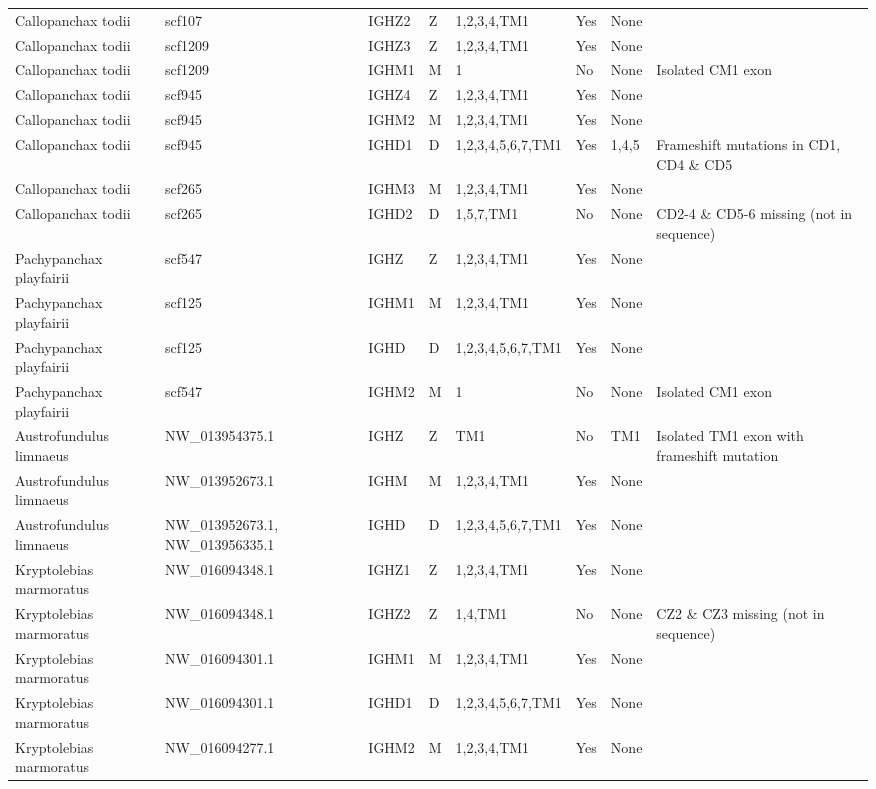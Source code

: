 \begin{tabular}{llllllll}
  Callopanchax todii & scf107 & IGHZ2 & Z & 1,2,3,4,TM1 & Yes & None &  \\ 
  Callopanchax todii & scf1209 & IGHZ3 & Z & 1,2,3,4,TM1 & Yes & None &  \\ 
  Callopanchax todii & scf1209 & IGHM1 & M & 1 & No & None & Isolated CM1 exon \\ 
  Callopanchax todii & scf945 & IGHZ4 & Z & 1,2,3,4,TM1 & Yes & None &  \\ 
  Callopanchax todii & scf945 & IGHM2 & M & 1,2,3,4,TM1 & Yes & None &  \\ 
  Callopanchax todii & scf945 & IGHD1 & D & 1,2,3,4,5,6,7,TM1 & Yes & 1,4,5 & Frameshift mutations in CD1, CD4 \& CD5 \\ 
  Callopanchax todii & scf265 & IGHM3 & M & 1,2,3,4,TM1 & Yes & None &  \\ 
  Callopanchax todii & scf265 & IGHD2 & D & 1,5,7,TM1 & No & None & CD2-4 \& CD5-6 missing (not in sequence) \\ 
  Pachypanchax playfairii & scf547 & IGHZ & Z & 1,2,3,4,TM1 & Yes & None &  \\ 
  Pachypanchax playfairii & scf125 & IGHM1 & M & 1,2,3,4,TM1 & Yes & None &  \\ 
  Pachypanchax playfairii & scf125 & IGHD & D & 1,2,3,4,5,6,7,TM1 & Yes & None &  \\ 
  Pachypanchax playfairii & scf547 & IGHM2 & M & 1 & No & None & Isolated CM1 exon \\ 
  Austrofundulus limnaeus & NW\_013954375.1 & IGHZ & Z & TM1 & No & TM1 & Isolated TM1 exon with frameshift mutation \\ 
  Austrofundulus limnaeus & NW\_013952673.1 & IGHM & M & 1,2,3,4,TM1 & Yes & None &  \\ 
  Austrofundulus limnaeus & NW\_013952673.1, NW\_013956335.1 & IGHD & D & 1,2,3,4,5,6,7,TM1 & Yes & None &  \\ 
  Kryptolebias marmoratus & NW\_016094348.1 & IGHZ1 & Z & 1,2,3,4,TM1 & Yes & None &  \\ 
  Kryptolebias marmoratus & NW\_016094348.1 & IGHZ2 & Z & 1,4,TM1 & No & None & CZ2 \& CZ3 missing (not in sequence) \\ 
  Kryptolebias marmoratus & NW\_016094301.1 & IGHM1 & M & 1,2,3,4,TM1 & Yes & None &  \\ 
  Kryptolebias marmoratus & NW\_016094301.1 & IGHD1 & D & 1,2,3,4,5,6,7,TM1 & Yes & None &  \\ 
  Kryptolebias marmoratus & NW\_016094277.1 & IGHM2 & M & 1,2,3,4,TM1 & Yes & None &  \\ 

\end{tabular}
